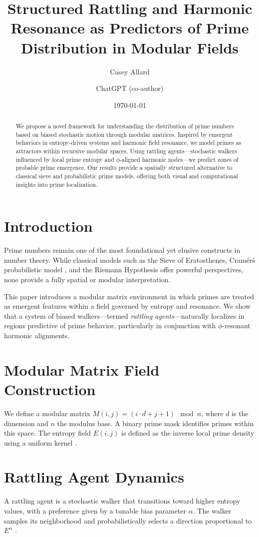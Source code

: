 \documentclass[12pt]{article}
\title{Structured Rattling and Harmonic Resonance as Predictors of Prime Distribution in Modular Fields}
\author{Casey Allard \and ChatGPT (co-author)}
\date{\today}
\begin{document}
\maketitle

\begin{abstract}
We propose a novel framework for understanding the distribution of prime numbers based on biased stochastic motion through modular matrices. Inspired by emergent behaviors in entropy-driven systems and harmonic field resonance, we model primes as attractors within recursive modular spaces. Using rattling agents---stochastic walkers influenced by local prime entropy and $\phi$-aligned harmonic nodes---we predict zones of probable prime emergence. Our results provide a spatially structured alternative to classical sieve and probabilistic prime models, offering both visual and computational insights into prime localization.
\end{abstract}

\section{Introduction}
Prime numbers remain one of the most foundational yet elusive constructs in number theory. While classical models such as the Sieve of Eratosthenes, Cram\'er\'s probabilistic model \cite{cramer1936}, and the Riemann Hypothesis offer powerful perspectives, none provide a fully spatial or modular interpretation.

This paper introduces a modular matrix environment in which primes are treated as emergent features within a field governed by entropy and resonance. We show that a system of biased walkers---termed \textit{rattling agents}---naturally localizes in regions predictive of prime behavior, particularly in conjunction with $\phi$-resonant harmonic alignments.

\section{Modular Matrix Field Construction}
We define a modular matrix $M(i,j) = (i \cdot d + j + 1) \mod n$, where $d$ is the dimension and $n$ the modulus base. A binary prime mask identifies primes within this space. The entropy field $E(i,j)$ is defined as the inverse local prime density using a uniform kernel \cite{reich1996entropy}.

\section{Rattling Agent Dynamics}
A rattling agent is a stochastic walker that transitions toward higher entropy values, with a preference given by a tunable bias parameter $\alpha$. The walker samples its neighborhood and probabilistically selects a direction proportional to $E^\alpha$ \cite{wolf1997prime}.
\end{document}
